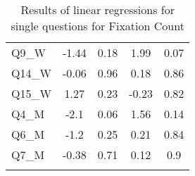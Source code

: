 \documentclass[output=paper]{langscibook}
\begin{document}
\begin{table}
\begin{floatrow}
{\begin{tabular}{l *{2}{S[table-format=-1.2]S[table-format=1.2]}  }
    Q9\_W  &  -1.44  & 0.18 &  1.99 & 0.07\\
    Q14\_W &  -0.06  & 0.96 &  0.18 & 0.86\\ 
    Q15\_W &   1.27  & 0.23 & -0.23 & 0.82\\
    Q4\_M  &   -2.1  & 0.06 &  1.56 & 0.14\\
    Q6\_M  &   -1.2  & 0.25 &  0.21 & 0.84\\
    Q7\_M  &  -0.38  & 0.71 &  0.12 & 0.9\\
 \lspbottomrule
 \end{tabular}}
 {\caption{Results of linear regressions for single questions for Fixation Count\label{tab:2:results of linear regressions FC}}}
\end{floatrow}
\end{table}

\end{document}
